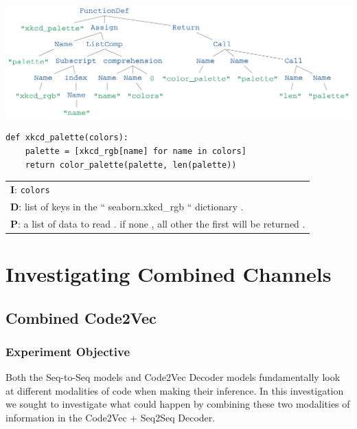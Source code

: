 \begin{listing}[h!] 
\begin{center}

\includegraphics[width=\linewidth]{ImagesCodeRelated/xkcd_palette_strip.png}
\begin{verbatim}
def xkcd_palette(colors):
    palette = [xkcd_rgb[name] for name in colors]
    return color_palette(palette, len(palette))

\end{verbatim}
\begin{tabular}{l}
\textbf{I}: \texttt{colors}\\
\textbf{D}: list of keys in the `` seaborn.xkcd\_rgb `` dictionary .\\
\textbf{P}: a list of data to read . if none , all other the first will be returned .\\
\end{tabular}
\end{center}
\end{listing}







\section{Investigating Combined Channels} %
\label{sec:investigating_combined_channels}


\subsection{Combined Code2Vec } %
\label{sub:combined_code2vec}


\subsubsection{Experiment Objective} %

Both the Seq-to-Seq models and Code2Vec Decoder models fundamentally look at different modalities of code when making their inference.
In this investigation we sought to investigate what could happen by combining these two modalities of information in the Code2Vec + Seq2Seq Decoder.

